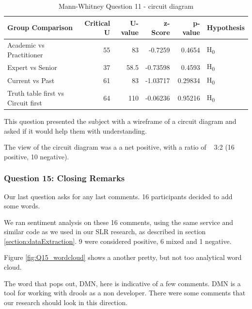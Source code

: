 \begin{table}[H]
    \begin{center}
        \begin{tabular}{ |l ||r |r |r | r|l | } 
            \hline
            Group Comparison                   & Critical U & U-value & z-Score  & p-value & Hypothesis         \\
            \hline
            \hline
            Academic vs Practitioner           & 55         & 83      & -0.7259  & 0.4654  & H\textsubscript{0} \\ 
            \hline
            Expert vs Senior                   & 37         & 58.5    & -0.73598 & 0.4593  & H\textsubscript{0} \\ 
            \hline
            Current vs Past                    & 61         & 83      & -1.03717 & 0.29834 & H\textsubscript{0} \\ 
            \hline
            Truth table first vs Circuit first & 64         & 110     & -0.06236 & 0.95216 & H\textsubscript{0} \\ 
            \hline
        \end{tabular}
    \end{center}
    \caption{Mann-Whitney Question 11 - circuit diagram}
    \label{table:mannwhitneyQ7}
\end{table}

This question presented the subject with a wireframe of a circuit diagram and asked if it would help them with understanding.

The view of the circuit diagram was a a net positive, with a ratio of ~ 3:2 (16 positive, 10 negative).

\subsubsection{Question 15: Closing Remarks}

Our last question asks for any last comments.
16 participants decided to add some words.

We ran sentiment analysis on these 16 comments, using the same service and similar code as we used in our SLR research, as described in section \ref{section:dataExtraction}.
9 were considered positive, 6 mixed and 1 negative.

Figure \ref{fig:Q15_wordcloud} shows a another pretty, but not too analytical word cloud.

The word that pops out, DMN, here is indicative of a few comments.
DMN is a tool for working with drools as a non developer.
There were some comments that our research should look in this direction.

